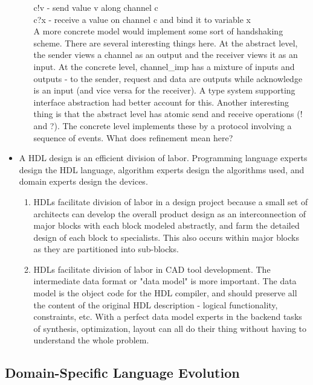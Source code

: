 \documentclass[10pt,twoside]{article}
\begin{document}
\begin{itemize}
\begin{enumerate}
        c!v   - send value v along channel c\\
        c?x   - receive a value on channel c and bind it to variable x\\
        
    A more concrete model would implement some sort of handshaking
    scheme. 
    There are several interesting things here. At the abstract level, the
    sender views a channel as an output and the receiver views it as an
    input. At the concrete level, channel\_imp has a mixture of inputs and
    outputs - to the sender, request and data are outputs while
    acknowledge is an input (and vice versa for the receiver). A type
    system supporting interface abstraction had better account for this.
    Another interesting thing is that the abstract level has atomic send
    and receive operations (! and ?). The concrete level implements
    these by a protocol involving a sequence of events. What does
    refinement mean here?
\end{enumerate}    



\item A HDL design is an efficient division of labor. Programming
language experts design the HDL  language, algorithm experts design the
algorithms used, and domain
experts design the devices. 
\begin{enumerate}
  \item HDLs facilitate division of labor in a design project because a
    small set of architects can develop the overall product design as an
    interconnection of major blocks with each block modeled abstractly,
    and farm the detailed design of each block to specialists. This also
    occurs within major blocks as they are partitioned into sub-blocks.

  \item HDLs facilitate division of labor in CAD tool development. The
    intermediate data format or "data model" is more important.
    The data model is the object code for the HDL compiler, and should
    preserve all the content of the original HDL description - logical
    functionality, constraints, etc.  With a perfect data
    model experts in the backend tasks of synthesis, optimization, layout
    can all do their thing without having to understand the whole
    problem. 
\end{enumerate}    


\end{itemize}


\subsection{Domain-Specific Language Evolution}
\end{document}
